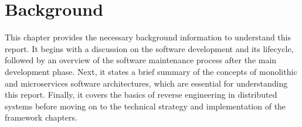 \chapter{Background}\label{chap:background}

This chapter provides the necessary background information to understand this report. It begins with a discussion on the software development and its lifecycle, followed by an overview of the software maintenance process after the main development phase. Next, it states a brief summary of the concepts of monolithic and microservices software architectures, which are essential for understanding this report. Finally, it covers the basics of reverse engineering in distributed systems before moving on to the technical strategy and implementation of the framework chapters.
